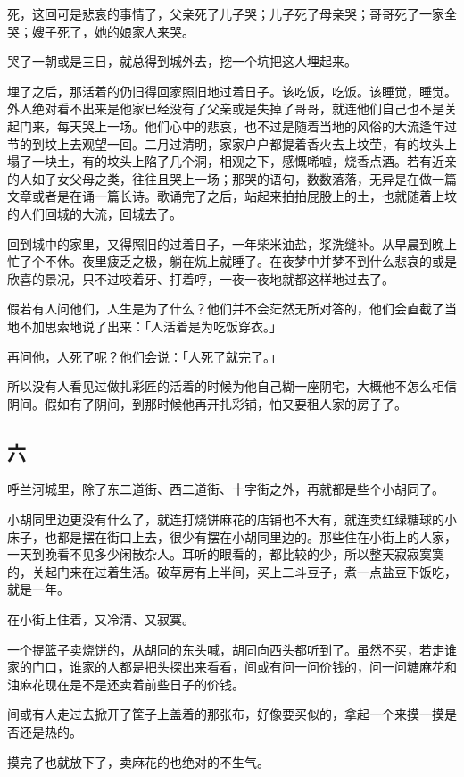 \documentclass[UTF8]{ctexart}
\begin{document}
死，这回可是悲哀的事情了，父亲死了儿子哭；儿子死了母亲哭；哥哥死了一家全哭；嫂子死了，她的娘家人来哭。

哭了一朝或是三日，就总得到城外去，挖一个坑把这人埋起来。

埋了之后，那活着的仍旧得回家照旧地过着日子。该吃饭，吃饭。该睡觉，睡觉。外人绝对看不出来是他家已经没有了父亲或是失掉了哥哥，就连他们自己也不是关起门来，每天哭上一场。他们心中的悲哀，也不过是随着当地的风俗的大流逢年过节的到坟上去观望一回。二月过清明，家家户户都提着香火去上坟茔，有的坟头上塌了一块土，有的坟头上陷了几个洞，相观之下，感慨唏嘘，烧香点酒。若有近亲的人如子女父母之类，往往且哭上一场；那哭的语句，数数落落，无异是在做一篇文章或者是在诵一篇长诗。歌诵完了之后，站起来拍拍屁股上的土，也就随着上坟的人们回城的大流，回城去了。

回到城中的家里，又得照旧的过着日子，一年柴米油盐，浆洗缝补。从早晨到晚上忙了个不休。夜里疲乏之极，躺在炕上就睡了。在夜梦中并梦不到什么悲哀的或是欣喜的景况，只不过咬着牙、打着哼，一夜一夜地就都这样地过去了。

假若有人问他们，人生是为了什么？他们并不会茫然无所对答的，他们会直截了当地不加思索地说了出来：「人活着是为吃饭穿衣。」

再问他，人死了呢？他们会说：「人死了就完了。」

所以没有人看见过做扎彩匠的活着的时候为他自己糊一座阴宅，大概他不怎么相信阴间。假如有了阴间，到那时候他再开扎彩铺，怕又要租人家的房子了。

\subsection{六}

呼兰河城里，除了东二道街、西二道街、十字街之外，再就都是些个小胡同了。

小胡同里边更没有什么了，就连打烧饼麻花的店铺也不大有，就连卖红绿糖球的小床子，也都是摆在街口上去，很少有摆在小胡同里边的。那些住在小街上的人家，一天到晚看不见多少闲散杂人。耳听的眼看的，都比较的少，所以整天寂寂寞寞的，关起门来在过着生活。破草房有上半间，买上二斗豆子，煮一点盐豆下饭吃，就是一年。

在小街上住着，又冷清、又寂寞。

一个提篮子卖烧饼的，从胡同的东头喊，胡同向西头都听到了。虽然不买，若走谁家的门口，谁家的人都是把头探出来看看，间或有问一问价钱的，问一问糖麻花和油麻花现在是不是还卖着前些日子的价钱。

间或有人走过去掀开了筐子上盖着的那张布，好像要买似的，拿起一个来摸一摸是否还是热的。

摸完了也就放下了，卖麻花的也绝对的不生气。
\end{document}
